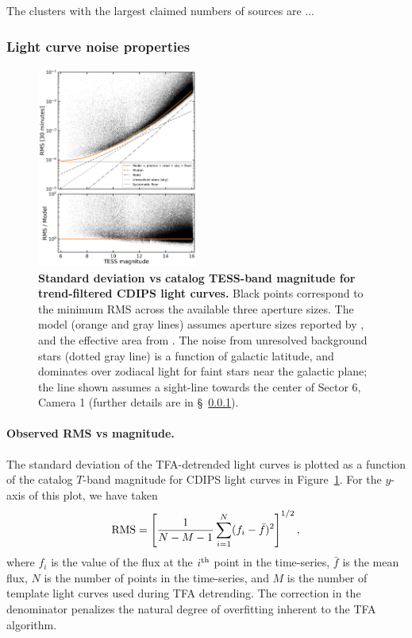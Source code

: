 \documentclass[12pt,twocolumn,tighten]{aastex62}
\begin{document}
The clusters with the largest claimed numbers of sources are ...


\subsubsection{Light curve noise properties}
\label{subsubsec:rmsvsmag}

\begin{figure}[t]
	\begin{center}
		\leavevmode
		\includegraphics[width=0.47\textwidth]{rms_vs_mag.png}
	\end{center}
	\vspace{-0.5cm}
  \caption{ {\bf Standard deviation vs catalog TESS-band magnitude for
  trend-filtered CDIPS light curves.} 
  Black points correspond to the minimum RMS across the available three
  aperture sizes.  
  The model (orange and gray lines) assumes aperture sizes reported 
  by \citet{Sullivan_et_al_2015}, and the effective area from 
  \citet{vanderspek_2018}.
  The noise from unresolved background stars (dotted gray line) is a function 
  of galactic latitude, and dominates over zodiacal light
  for faint stars near the galactic plane; the line shown assumes a
  sight-line towards the center of Sector 6, Camera 1 (further details
  are in \S~\ref{subsubsec:rmsvsmag}).
		\label{fig:rms_vs_mag}
	}
\end{figure}

\paragraph{Observed RMS vs magnitude.}
The standard deviation of the TFA-detrended light curves is plotted as
a function of the catalog $T$-band magnitude for CDIPS light curves in
Figure~\ref{fig:rms_vs_mag}.
For the $y$-axis of this plot, we have taken
\begin{equation}
  {\rm RMS} = \left[
    \frac{1}{N-M-1}
    \sum_{i=1}^{N} (f_i - \bar{f})^2
  \right]^{1/2},
\end{equation}
where $f_i$ is the value of the flux at the $i^{\rm th}$ point in the
time-series, $\bar{f}$ is the mean flux, $N$ is the
number of points in the time-series, and $M$ is the number
of template light curves used during TFA detrending.
The correction in the denominator penalizes the natural degree of
overfitting inherent to the TFA algorithm.
\end{document}
